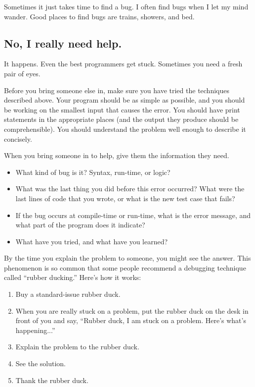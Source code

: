 \documentclass[12pt]{book}
\theoremstyle{exercise}
\begin{document}
Sometimes it just takes time to find a bug.  I often find bugs when I
let my mind wander.  Good places to find bugs are trains, showers, and
bed.


\subsection*{No, I really need help.}

It happens.  Even the best programmers get stuck.
Sometimes you need a fresh pair of eyes.

Before you bring someone else in, make sure you have tried
the techniques described above.  Your program should be as simple
as possible, and you should be working on the smallest input
that causes the error.  You should have print statements in the
appropriate places (and the output they produce should be
comprehensible).  You should understand the problem well enough
to describe it concisely.

When you bring someone in to help, give
them the information they need.

\begin{itemize}

\item What kind of bug is it?  Syntax, run-time, or logic?

\item What was the last thing you did before this error occurred?
What were the last lines of code that you wrote, or what is
the new test case that fails?

\item If the bug occurs at compile-time or run-time, what is
the error message, and what part of the program does it indicate?

\item What have you tried, and what have you learned?

\end{itemize}

By the time you explain the problem
to someone, you might see the answer.  This phenomenon
is so common that some people recommend a debugging technique
called ``rubber ducking.''  Here's how it works:

\begin{enumerate}

\item Buy a standard-issue rubber duck.

\item When you are really stuck on a problem, put the rubber
duck on the desk in front of you and say, ``Rubber duck, I
am stuck on a problem.  Here's what's happening...''

\item Explain the problem to the rubber duck.

\item See the solution.

\item Thank the rubber duck.

\end{enumerate}
\end{document}
